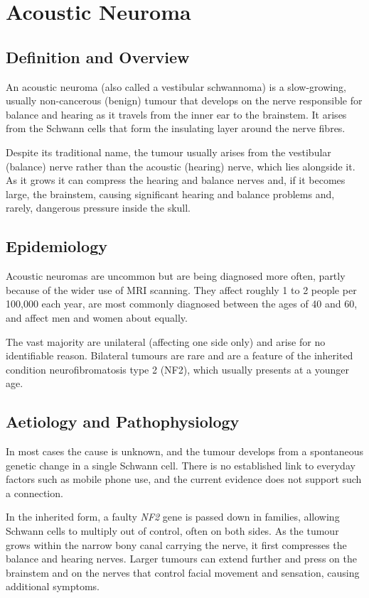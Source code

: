 \chapter{Acoustic Neuroma}

\section*{Definition and Overview}
An acoustic neuroma (also called a vestibular schwannoma) is a slow-growing, usually non-cancerous (benign) tumour that develops on the nerve responsible for balance and hearing as it travels from the inner ear to the brainstem. It arises from the Schwann cells that form the insulating layer around the nerve fibres.

Despite its traditional name, the tumour usually arises from the vestibular (balance) nerve rather than the acoustic (hearing) nerve, which lies alongside it. As it grows it can compress the hearing and balance nerves and, if it becomes large, the brainstem, causing significant hearing and balance problems and, rarely, dangerous pressure inside the skull.

\section*{Epidemiology}
Acoustic neuromas are uncommon but are being diagnosed more often, partly because of the wider use of MRI scanning. They affect roughly 1 to 2 people per 100,000 each year, are most commonly diagnosed between the ages of 40 and 60, and affect men and women about equally.

The vast majority are unilateral (affecting one side only) and arise for no identifiable reason. Bilateral tumours are rare and are a feature of the inherited condition neurofibromatosis type 2 (NF2), which usually presents at a younger age.

\section*{Aetiology and Pathophysiology}
In most cases the cause is unknown, and the tumour develops from a spontaneous genetic change in a single Schwann cell. There is no established link to everyday factors such as mobile phone use, and the current evidence does not support such a connection.

In the inherited form, a faulty \textit{NF2} gene is passed down in families, allowing Schwann cells to multiply out of control, often on both sides. As the tumour grows within the narrow bony canal carrying the nerve, it first compresses the balance and hearing nerves. Larger tumours can extend further and press on the brainstem and on the nerves that control facial movement and sensation, causing additional symptoms.


